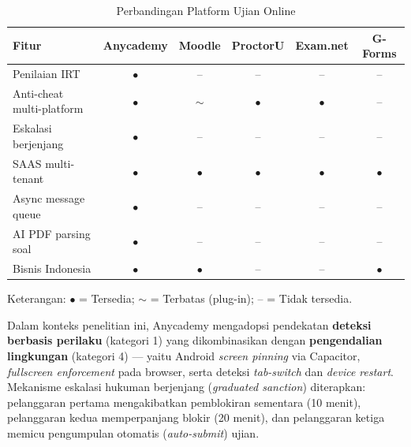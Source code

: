 \begin{table}[H]
	\centering
	\small
	\caption{Perbandingan Platform Ujian Online}
	\label{tab:platform-comparison}
	\begin{tabular}{|l|c|c|c|c|c|}
		\hline
		\textbf{Fitur}            & \textbf{Anycademy} & \textbf{Moodle} & \textbf{ProctorU} & \textbf{Exam.net} & \textbf{G-Forms} \\
		\hline
		Penilaian IRT             & $\bullet$          & --              & --                & --                & --               \\
		\hline
		Anti-cheat multi-platform & $\bullet$          & $\sim$          & $\bullet$         & $\bullet$         & --               \\
		\hline
		Eskalasi berjenjang       & $\bullet$          & --              & --                & --                & --               \\
		\hline
		SAAS multi-tenant         & $\bullet$          & $\bullet$       & $\bullet$         & $\bullet$         & $\bullet$        \\
		\hline
		Async message queue       & $\bullet$          & --              & --                & --                & --               \\
		\hline
		AI PDF parsing soal       & $\bullet$          & --              & --                & --                & --               \\
		\hline
		Bisnis Indonesia          & $\bullet$          & $\bullet$       & --                & --                & $\bullet$        \\
		\hline
	\end{tabular}
\end{table}

Keterangan: $\bullet$ = Tersedia; $\sim$ = Terbatas (plug-in); -- = Tidak tersedia.

Dalam konteks penelitian ini, Anycademy mengadopsi pendekatan \textbf{deteksi berbasis perilaku} (kategori 1) yang dikombinasikan dengan \textbf{pengendalian lingkungan} (kategori 4) — yaitu Android \textit{screen pinning} via Capacitor, \textit{fullscreen enforcement} pada browser, serta deteksi \textit{tab-switch} dan \textit{device restart}. Mekanisme eskalasi hukuman berjenjang (\textit{graduated sanction}) diterapkan: pelanggaran pertama mengakibatkan pemblokiran sementara (10 menit), pelanggaran kedua memperpanjang blokir (20 menit), dan pelanggaran ketiga memicu pengumpulan otomatis (\textit{auto-submit}) ujian.

